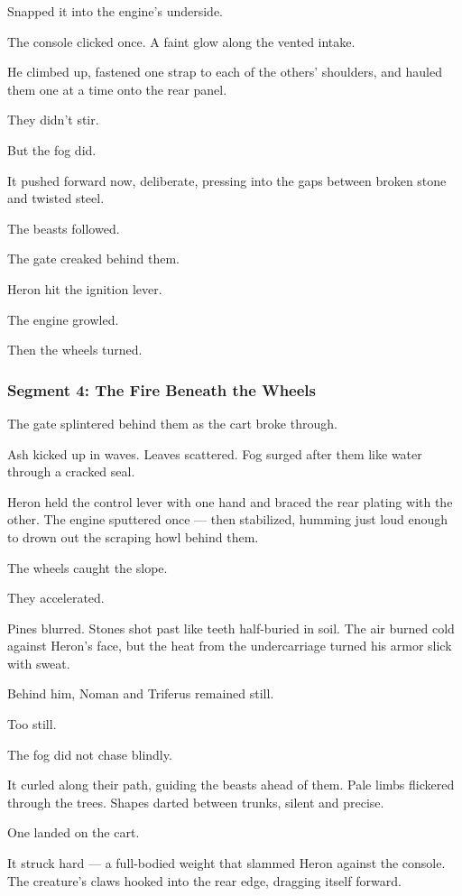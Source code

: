 \documentclass[9pt]{article}
\begin{document}
Snapped it into the engine’s underside.

The console clicked once. A faint glow along the vented intake.

He climbed up, fastened one strap to each of the others’ shoulders, and hauled them one at a time onto the rear panel.

They didn’t stir.

But the fog did.

It pushed forward now, deliberate, pressing into the gaps between broken stone and twisted steel.

The beasts followed.

The gate creaked behind them.

Heron hit the ignition lever.

The engine growled.

Then the wheels turned.


\newpage

\subsubsection*{Segment 4: The Fire Beneath the Wheels}

The gate splintered behind them as the cart broke through.

Ash kicked up in waves. Leaves scattered. Fog surged after them like water through a cracked seal.

Heron held the control lever with one hand and braced the rear plating with the other. The engine sputtered once — then stabilized, humming just loud enough to drown out the scraping howl behind them.

The wheels caught the slope.

They accelerated.

Pines blurred. Stones shot past like teeth half-buried in soil. The air burned cold against Heron’s face, but the heat from the undercarriage turned his armor slick with sweat.

Behind him, Noman and Triferus remained still.

Too still.

\bigskip

The fog did not chase blindly.

It curled along their path, guiding the beasts ahead of them. Pale limbs flickered through the trees. Shapes darted between trunks, silent and precise.

One landed on the cart.

It struck hard — a full-bodied weight that slammed Heron against the console. The creature’s claws hooked into the rear edge, dragging itself forward.
\end{document}
